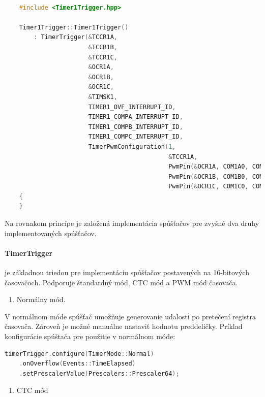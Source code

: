 \begin{lstlisting}[language=c++]  

    #include <Timer1Trigger.hpp>

    Timer1Trigger::Timer1Trigger()
        : TimerTrigger(&TCCR1A,
                       &TCCR1B,
                       &TCCR1C,
                       &OCR1A,
                       &OCR1B,
                       &OCR1C,
                       &TIMSK1,
                       TIMER1_OVF_INTERRUPT_ID,
                       TIMER1_COMPA_INTERRUPT_ID,
                       TIMER1_COMPB_INTERRUPT_ID,
                       TIMER1_COMPC_INTERRUPT_ID,
                       TimerPwmConfiguration(1,
                                             &TCCR1A,
                                             PwmPin(&OCR1A, COM1A0, COM1A1),
                                             PwmPin(&OCR1B, COM1B0, COM1B1),
                                             PwmPin(&OCR1C, COM1C0, COM1C1)))
    {
    }
\end{lstlisting}

Na rovnakom princípe je založená implementácia spúšťačov pre zvyšné dva druhy implementovaných spúšťačov. \par

\paragraph*{TimerTrigger} \: je základnou triedou pre implementáciu spúšťačov postavených na 16-bitových časovačoch. Podporuje štandardný mód, CTC mód a PWM mód časovača.

\begin{enumerate}
    \item Normálny mód.
\end{enumerate}

V normálnom móde spúšťač umožňuje generovanie udalosti po pretečení registra časovača. Zároveň je možné manuálne nastaviť hodnotu preddeličky.
Príklad konfigurácie spúštača pre použitie v normálnom móde:
\begin{lstlisting}[language=c++]      
timerTrigger.configure(TimerMode::Normal)
    .onOverflow(Events::TimeElapsed)
    .setPrescalerValue(Prescalers::Prescaler64);
\end{lstlisting}


\begin{enumerate}[resume]
    \item CTC mód
\end{enumerate}

